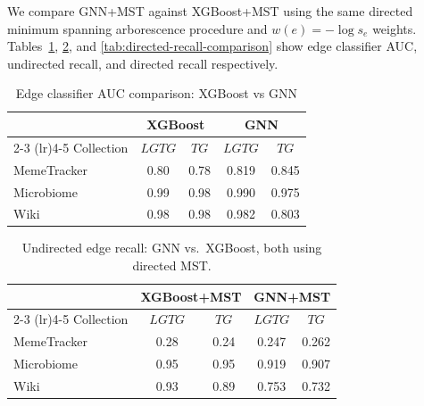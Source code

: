 \documentclass{article}
\begin{document}
    We compare GNN+MST against XGBoost+MST using the same directed minimum spanning arborescence procedure and $w(e)=-\log s_e$ weights. Tables~\ref{tab:auc-comparison}, \ref{tab:recall-comparison}, and \ref{tab:directed-recall-comparison} show edge classifier AUC, undirected recall, and directed recall respectively.

    \begin{table}[h]
        \centering
        \caption{Edge classifier AUC comparison: XGBoost vs GNN}
        \label{tab:auc-comparison} \small
        \begin{tabular}{lcccc}
            \toprule                                         & \multicolumn{2}{c}{XGBoost} & \multicolumn{2}{c}{GNN} \\
            \cmidrule(lr){2-3} \cmidrule(lr){4-5} Collection & $LGTG$                      & $TG$                   & $LGTG$ & $TG$  \\
            \midrule MemeTracker                             & 0.80                        & 0.78                   & 0.819  & 0.845 \\
            Microbiome                                       & 0.99                        & 0.98                   & 0.990  & 0.975 \\
            Wiki                                             & 0.98                        & 0.98                   & 0.982  & 0.803 \\
            \bottomrule
        \end{tabular}
    \end{table}

    \begin{table}[h]
        \centering
        \caption{Undirected edge recall: GNN vs.\ XGBoost, both using directed MST.}
        \label{tab:recall-comparison} \small
        \begin{tabular}{lcccc}
            \toprule                                         & \multicolumn{2}{c}{XGBoost+MST} & \multicolumn{2}{c}{GNN+MST} \\
            \cmidrule(lr){2-3} \cmidrule(lr){4-5} Collection & $LGTG$                            & $TG$                          & $LGTG$ & $TG$  \\
            \midrule MemeTracker                             & 0.28                              & 0.24                          & 0.247  & 0.262 \\
            Microbiome                                       & 0.95                                & 0.95                            & 0.919  & 0.907 \\
            Wiki                                             & 0.93                                & 0.89                            & 0.753  & 0.732 \\
            \bottomrule
        \end{tabular}
    \end{table}
\end{document}

